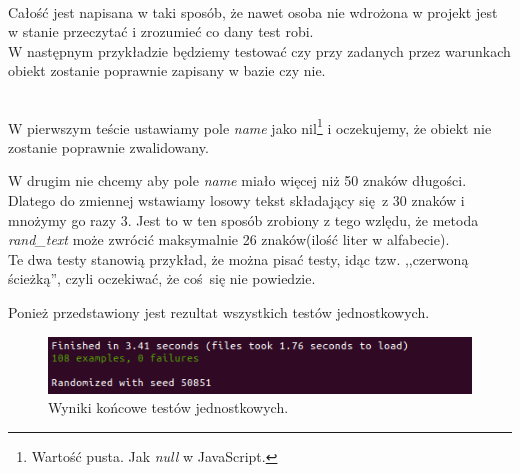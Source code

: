 \begin{code}
	
\end{code}\\

Całość jest napisana w taki sposób, że nawet osoba nie wdrożona w projekt jest w stanie przeczytać i zrozumieć co dany test robi.
\\

W następnym przykładzie będziemy testować czy przy zadanych przez warunkach obiekt zostanie poprawnie zapisany w bazie czy nie.

\begin{code}
	
\end{code}\\

W pierwszym teście ustawiamy pole \emph{name} jako nil\footnote{Wartość pusta. Jak \emph{null} w JavaScript.} i oczekujemy, że obiekt nie zostanie poprawnie zwalidowany.

W drugim nie chcemy aby pole \emph{name} miało więcej niż 50 znaków długości. Dlatego do zmiennej wstawiamy losowy tekst składający się z 30 znaków i mnożymy go razy 3. Jest to w ten sposób zrobiony z tego wzlędu, że metoda \emph{rand\_text} może zwrócić maksymalnie 26 znaków(ilość liter w alfabecie).
\\

Te dwa testy stanowią przykład, że można pisać testy, idąc tzw. ,,czerwoną ścieżką'', czyli oczekiwać, że coś się nie powiedzie.

Ponież przedstawiony jest rezultat wszystkich testów jednostkowych.

\begin{figure}[h]
  \centering
  \includegraphics[scale=0.8]{images/rspec_result.png}
  \caption{Wyniki końcowe testów jednostkowych.}
\end{figure}
